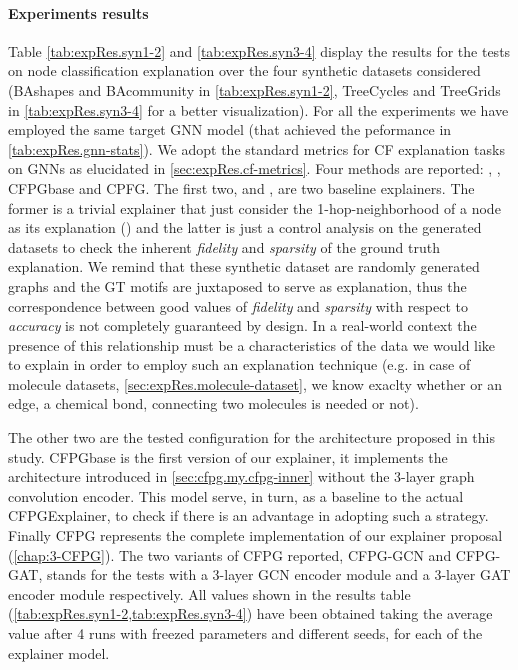 \documentclass[binding=0.6cm]{sapthesis}
\newcommand{\mycite}[1]{(\cite{#1})}
\begin{document}
\paragraph{Experiments results}
Table \ref{tab:expRes.syn1-2} and \ref{tab:expRes.syn3-4} display the results for the tests on node classification explanation over the four synthetic datasets considered (BAshapes and BAcommunity in \cref{tab:expRes.syn1-2}, TreeCycles and TreeGrids in \cref{tab:expRes.syn3-4} for a better visualization). For all the experiments we have employed the same target GNN model (that achieved the peformance in \cref{tab:expRes.gnn-stats}).
We adopt the standard metrics for CF explanation tasks on GNNs as elucidated in \cref{sec:expRes.cf-metrics}. Four methods are reported: , , CFPGbase and CPFG. 
The first two,  and , are two baseline explainers. The former is a trivial explainer that just consider the 1-hop-neighborhood of a node as its explanation \mycite{lucic2022-cfgnnexplainer} and the latter is just a control analysis on the generated datasets to check the inherent \textit{fidelity} and \textit{sparsity} of the ground truth explanation. We remind that these synthetic dataset are randomly generated graphs and the GT motifs are juxtaposed to serve as explanation, thus the correspondence between good values of \textit{fidelity} and \textit{sparsity} with respect to \textit{accuracy} is not completely guaranteed by design. In a real-world context the presence of this relationship must be a characteristics of the data we would like to explain in order to employ such an explanation technique (e.g. in case of molecule datasets, \cref{sec:expRes.molecule-dataset}, we know exaclty whether or an edge, a chemical bond, connecting two molecules is needed or not). 

The other two are the tested configuration for the architecture proposed in this study. CFPGbase is the first version of our explainer, it implements the architecture introduced in \ref{sec:cfpg.my.cfpg-inner} without the 3-layer graph convolution encoder. 
This model serve, in turn, as a baseline to the actual CFPGExplainer, to check if there is an advantage in adopting such a strategy. Finally CFPG represents the complete implementation of our explainer proposal (\cref{chap:3-CFPG}). The two variants of CFPG reported, CFPG-GCN and CFPG-GAT, stands for the tests with a 3-layer GCN encoder module and a 3-layer GAT encoder module respectively.
All values shown in the results table (\cref{tab:expRes.syn1-2,tab:expRes.syn3-4}) have been obtained taking the average value after 4 runs with freezed parameters and different seeds, for each of the explainer model.
\end{document}

